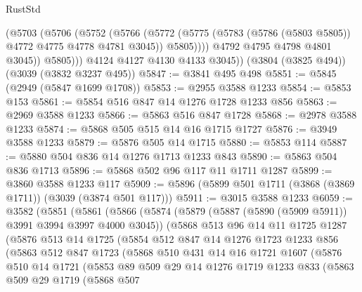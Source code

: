 \begin{lexlean}{RustStd}
\begin{coremodule}
                (@5703
                  (@5706
                    (@5752
                      (@5766
                        (@5772
                          (@5775 (@5783 (@5786 (@5803 @5805)) @4772 @4775 @4778 @4781 @3045))
                          @5805))))
                  @4792
                  @4795
                  @4798
                  @4801
                  @3045))
              @5805)))
        @4124
        @4127
        @4130
        @4133
        @3045))
    (@3804 (@3825 @494))
    (@3039 (@3832 @3237 @495))
@5847 := @3841 @495 @498
@5851 := @5845 (@2949 (@5847 @1699 @1708))
@5853 := @2955 @3588 @1233
@5854 := @5853 @153
@5861 := @5854 @516 @847 @14 @1276 @1728 @1233 @856
@5863 := @2969 @3588 @1233
@5866 := @5863 @516 @847 @1728
@5868 := @2978 @3588 @1233
@5874 := @5868 @505 @515 @14 @16 @1715 @1727
@5876 := @3949 @3588 @1233
@5879 := @5876 @505 @14 @1715
@5880 := @5853 @114
@5887 := @5880 @504 @836 @14 @1276 @1713 @1233 @843
@5890 := @5863 @504 @836 @1713
@5896 := @5868 @502 @96 @117 @11 @1711 @1287
@5899 := @3860 @3588 @1233 @117
@5909 := @5896 (@5899 @501 @1711 (@3868 (@3869 @1711)) (@3039 (@3874 @501 @117)))
@5911 := @3015 @3588 @1233
@6059 := @3582
    (@5851
      (@5861
        (@5866
          (@5874
            (@5879 (@5887 (@5890 (@5909 @5911)) @3991 @3994 @3997 @4000 @3045))
            (@5868
              @513
              @96
              @14
              @11
              @1725
              @1287
              (@5876
                @513
                @14
                @1725
                (@5854
                  @512
                  @847
                  @14
                  @1276
                  @1723
                  @1233
                  @856
                  (@5863
                    @512
                    @847
                    @1723
                    (@5868
                      @510
                      @431
                      @14
                      @16
                      @1721
                      @1607
                      (@5876
                        @510
                        @14
                        @1721
                        (@5853
                          @89
                          @509
                          @29
                          @14
                          @1276
                          @1719
                          @1233
                          @833
                          (@5863
                            @509
                            @29
                            @1719
                            (@5868
                              @507

\end{coremodule}
\end{lexlean}
